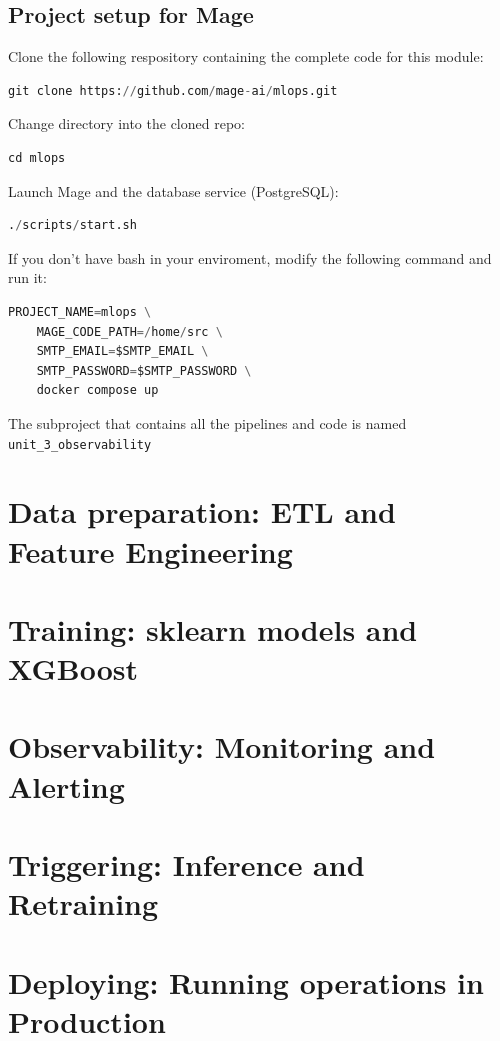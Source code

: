 \documentclass[letterpaper,12pt,notitlepage,twoside]{report}
\begin{document}
\subsection{Project setup for Mage}
Clone the following respository containing the complete code for this module:
\begin{lstlisting}[language=python, numbers=none]
git clone https://github.com/mage-ai/mlops.git
\end{lstlisting}

Change directory into the cloned repo:
\begin{lstlisting}[language=python, numbers=none]
cd mlops
\end{lstlisting}

Launch Mage and the database service (PostgreSQL):
\begin{lstlisting}[language=python, numbers=none]
./scripts/start.sh
\end{lstlisting}

If you don't have bash in your enviroment, modify the following command and run it:
\begin{lstlisting}[language=python, numbers=none]
PROJECT_NAME=mlops \
    MAGE_CODE_PATH=/home/src \
    SMTP_EMAIL=$SMTP_EMAIL \
    SMTP_PASSWORD=$SMTP_PASSWORD \
    docker compose up
\end{lstlisting}

The subproject that contains all the pipelines and code is named \texttt{unit\_3\_observability}





\section{Data preparation: ETL and Feature Engineering}
\section{Training: sklearn models and XGBoost}
\section{Observability: Monitoring and Alerting}
\section{Triggering: Inference and Retraining}
\section{Deploying: Running operations in Production}
\end{document}
